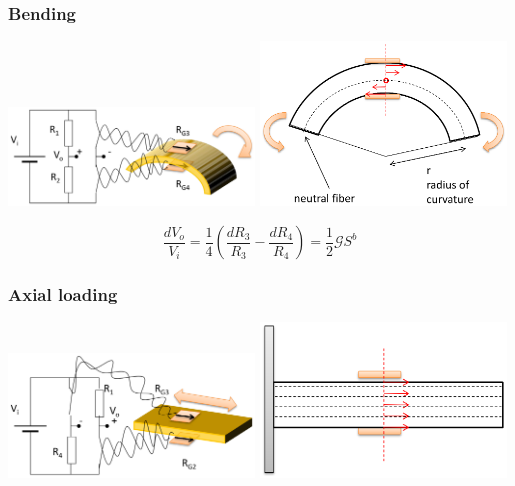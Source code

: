 \documentclass[11pt]{article}
\begin{document}
\subsubsection{Bending}
\label{sec:org77e8211}
\begin{center}
\includegraphics[width=0.49\textwidth]{./images/half-bridge-bending-circuit-diagram.png}
\includegraphics[width=0.49\textwidth]{./images/half-bridge-bending-diagram.png}
\end{center}

\[\frac{dV_o}{V_i} = \frac{1}{4} \left(\frac{dR_3}{R_3} - \frac{dR_4}{R_4} \right) = \frac{1}{2} \mathcal{G} S^b\]
\subsubsection{Axial loading}
\label{sec:orgef33467}
\begin{center}
\includegraphics[width=0.49\textwidth]{./images/half-bridge-axial-loading-circuit-diagram.png}
\includegraphics[width=0.49\textwidth]{./images/half-bridge-axial-loading-diagram.png}
\end{center}
\end{document}
